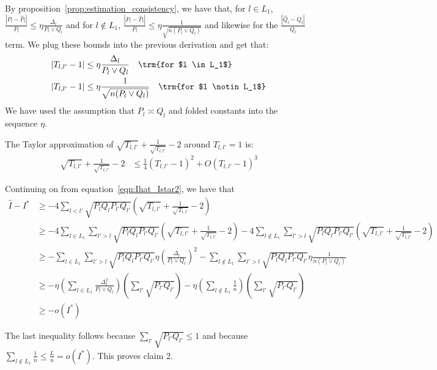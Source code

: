 \documentclass{article}
\begin{document}
By proposition~\ref{prop:estimation_consistency}, we have that, for $l \in L_1$, $\frac{|P_l - \hat{P}_l|}{P_l} \leq \eta \frac{\Delta_l}{P_l \vee Q_l}$ and for $l \notin L_1$, $\frac{|P_l - \hat{P}_l|}{P_l} \leq \eta \frac{1}{\sqrt{n (P_l \vee Q_l)}}$ and likewise for the $\frac{|\hat{Q}_l - Q_l|}{Q_l}$ term. We plug these bounds into the previous derivation and get that:
\begin{align*}
|T_{l,l'} - 1|  &\leq \eta  \frac{\Delta_l}{P_l \vee Q_l}  \quad \trm{for $l \in L_1$}\\
|T_{l,l'} - 1 | &\leq \eta \frac{1}{\sqrt{ n (P_l \vee Q_l)}} \quad \trm{for $l \notin L_1$}
\end{align*}
We have used the assumption that $P_l \asymp Q_l$ and folded constants into the sequence $\eta$. 


The Taylor approximation of $\sqrt{T_{l,l'}} + \frac{1}{\sqrt{T_{l,l'}}} - 2$ around $T_{l,l'}=1$ is:
\begin{align*}
\sqrt{T_{l,l'}} + \frac{1}{\sqrt{T_{l,l'}}} -2  &\leq 
  \frac{1}{4} (T_{l,l'} - 1)^2 + O (T_{l,l'}-1)^3 
\end{align*}

Continuing on from equation~\ref{eqn:Ihat_Istar2}, we have that
\begin{align*}
\hat{I} - I^* &\geq - 4 \sum_{l < l'} \sqrt{P_l Q_l P_{l'} Q_{l'}} 
    \left( \sqrt{T_{l,l'}} + \frac{1}{\sqrt{T_{l,l'}}} - 2 \right) \\
&\geq - 4 \sum_{l \in L_1} \sum_{l' > l} \sqrt{P_l Q_l P_{l'} Q_{l'}} 
    \left( \sqrt{T_{l,l'}} + \frac{1}{\sqrt{T_{l,l'}}} - 2 \right) 
     - 4 \sum_{l \notin L_1} \sum_{l' > l} \sqrt{P_l Q_l P_{l'} Q_{l'}} 
    \left( \sqrt{T_{l,l'}} + \frac{1}{\sqrt{T_{l,l'}}} - 2 \right) \\
  &\geq - \sum_{l \in L_1} \sum_{l' > l} \sqrt{P_l Q_l P_{l'} Q_{l'}} 
             \eta \left( \frac{\Delta_l}{P_l \vee Q_l}  \right)^2 
        - \sum_{l \notin L_1} \sum_{l' > l} \sqrt{P_l Q_l P_{l'} Q_{l'}} 
             \eta \frac{1}{n (P_l \vee Q_l)} \\
 &\geq - \eta \left( \sum_{l \in L_1} \frac{\Delta_l^2}{P_l \vee Q_l} \right)
         \left( \sum_{l'}  \sqrt{P_{l'}Q_{l'}} \right) 
       - \eta \left( \sum_{l \notin L_1} \frac{1}{n} \right) 
          \left( \sum_{l'} \sqrt{P_{l'} Q_{l'} } \right) \\
 &\geq - o(I^*)
\end{align*}

The last inequality follows because $\sum_{l'} \sqrt{P_{l'} Q_{l'}} \leq 1$ and because $\sum_{l \notin L_1} \frac{1}{n} \leq \frac{L}{n} = o(I^*)$. This proves claim 2.
\end{document}
